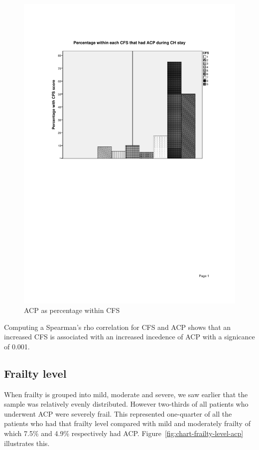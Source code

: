 \documentclass
[
	12pt,
	a4paper,
	oneside,
]{report}
\begin{document}
\begin{figure}[ht]
\caption{ACP as percentage within CFS}
\label{fig:chart-acp-cfs-percent}
\includegraphics[width=\textwidth,
	trim={2.5cm 14cm 2.5cm 2.5cm},
	clip]{media/graph-cfs-acp-percent}
\end{figure}

Computing a Spearman's rho correlation for CFS 
and ACP shows that an increased CFS is associated with an increased incedence
of ACP with a signicance of 0.001.

\subsection{Frailty level}

When frailty is grouped into mild, moderate and severe, we saw earlier that the
sample was relatively evenly distributed. However two-thirds of all 
patients who underwent ACP were severely frail. This represented one-quarter of
all the patients who had that frailty level compared with mild and moderately
frailty of which 7.5\% and 4.9\% respectively had ACP. 
Figure~\ref{fig:chart-frailty-level-acp} illustrates this.
\end{document}
